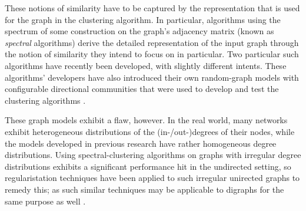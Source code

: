 These notions of similarity have to be captured by the representation that is used for the graph 
in the clustering algorithm. In particular, algorithms using the spectrum of some construction on 
the graph's adjacency matrix (known as \emph{spectral} algorithms) derive the detailed 
representation of the input graph through the notion of similarity they intend to focus on in 
particular. Two particular such algorithms have recently been developed, with slightly different 
intents. These algorithms' developers have also introduced their own random-graph models with 
configurable directional communities that were used to develop and test the clustering algorithms \cite{lucapaper, disimpaper}.

These graph models exhibit a flaw, however. In the real world, many networks exhibit heterogeneous 
distributions of the (in-/out-)degrees of their nodes, while the models developed in previous 
research have rather homogeneous degree distributions. Using spectral-clustering algorithms on 
graphs with irregular degree distributions exhibits a significant performance hit in the undirected 
setting, so regularistation techniques have been applied to such irregular unirected graphs to
remedy this; as such similar techniques may be applicable to digraphs for the same purpose as well \cite{rohereg, binyureg}.
